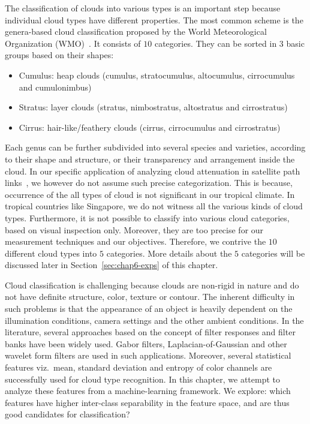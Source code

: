 The classification of clouds into various types is an important step because individual cloud types have different properties. The most common scheme is the genera-based cloud classification proposed by the World Meteorological Organization (WMO)~\cite{WMO_guide}. It consists of $10$ categories. They can be sorted in $3$ basic groups based on their shapes:
\begin{itemize}
\item Cumulus: heap clouds (cumulus, stratocumulus, altocumulus, cirrocumulus and cumulonimbus)
\item Stratus: layer clouds (stratus, nimbostratus, altostratus and cirrostratus)
\item Cirrus: hair-like/feathery clouds (cirrus, cirrocumulus and cirrostratus)
\end{itemize}
Each genus can be further subdivided into several species and varieties, according to their shape and structure, or their transparency and arrangement inside the cloud. In our specific application of analyzing cloud attenuation in satellite path links~\cite{cloud_model_compare}, we however do not assume such precise categorization. This is because, occurrence of the all types of cloud is not significant in our tropical climate. In tropical countries like Singapore, we do not witness all the various kinds of cloud types. Furthermore, it is not possible to classify into various cloud categories, based on visual inspection only. Moreover, they are too precise for our measurement techniques and our objectives. Therefore, we contrive the $10$ different cloud types into $5$ categories. More details about the $5$ categories will be discussed later in Section~\ref{sec:chap6-exps} of this chapter. 

 
Cloud classification is challenging because clouds are non-rigid in nature and do not have definite structure, color, texture or contour. The inherent difficulty in such problems is that the appearance of an object is heavily dependent on the illumination conditions, camera settings and the other ambient conditions. In the literature, several approaches based on the concept of filter responses and filter banks have been widely used. Gabor filters, Laplacian-of-Gaussian and other wavelet form filters are used in such applications. Moreover, several statistical features viz.\ mean, standard deviation and entropy of color channels are successfully used for cloud type recognition. In this chapter, we attempt to analyze these features from a machine-learning framework. We explore: which features have higher inter-class separability in the feature space, and are thus good candidates for classification?

